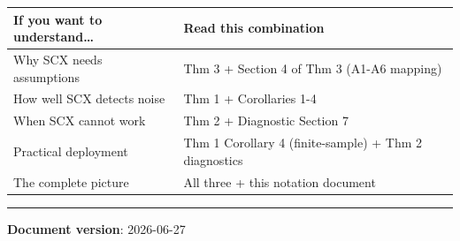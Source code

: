 \documentclass[
  12pt,
]{ctexart}
\begin{document}
\begin{longtable}[]{@{}
  >{\raggedright\arraybackslash}p{}
  >{\raggedright\arraybackslash}p{}@{}}
\toprule\noalign{}
\begin{minipage}[b]{\linewidth}\raggedright
If you want to understand\ldots{}
\end{minipage} & \begin{minipage}[b]{\linewidth}\raggedright
Read this combination
\end{minipage} \\
\midrule\noalign{}
\endhead
\bottomrule\noalign{}
\endlastfoot
Why SCX needs assumptions & Thm 3 + Section 4 of Thm 3 (A1-A6
mapping) \\
How well SCX detects noise & Thm 1 + Corollaries 1-4 \\
When SCX cannot work & Thm 2 + Diagnostic Section 7 \\
Practical deployment & Thm 1 Corollary 4 (finite-sample) + Thm 2
diagnostics \\
The complete picture & All three + this notation document \\
\end{longtable}

\begin{center}\rule{0.5\linewidth}{0.5pt}\end{center}

\textbf{Document version}: 2026-06-27
\end{document}
